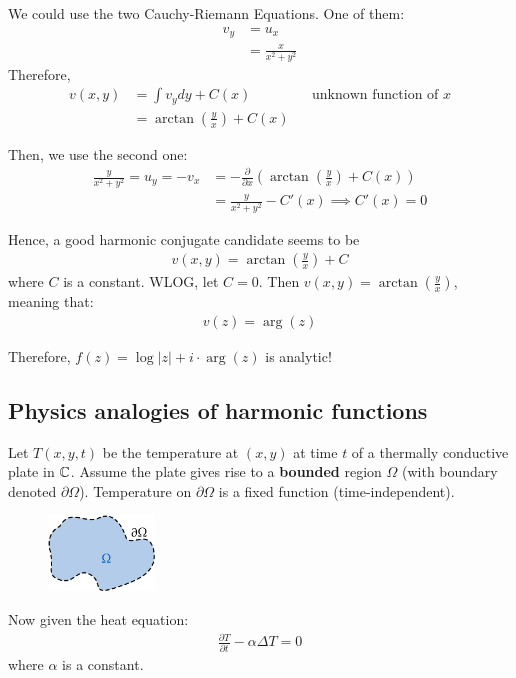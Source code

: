 \documentclass[12pt]{article}
\begin{document}
We could use the two Cauchy-Riemann Equations. One of them:
\begin{align*}
    v_y&=u_x\\
    &= \frac{x}{x^2+y^2}
\end{align*}
Therefore, \begin{align*}
    v(x,y) &= \int v_ydy + C(x) && \text{unknown function of }x\\
    &= \arctan\left(\frac{y}{x}\right)+C(x)
\end{align*}

Then, we use the second one: \begin{align*}
    \frac{y}{x^2+y^2}=u_y=-v_x &= -\frac{\partial}{\partial x} \left( \arctan\left(\frac{y}{x}\right)+C(x)\right)\\
    &= \frac{y}{x^2+y^2}-C'(x) \implies C'(x)=0
\end{align*}

Hence, a good harmonic conjugate candidate seems to be \begin{align*}
    v(x,y) = \arctan\left(\frac{y}{x}\right) + C
\end{align*}
where $C$ is a constant. WLOG, let $C=0$. Then $ v(x,y)=\arctan\left(\frac{y}{x}\right)$, meaning that: \begin{align*}
    v(z)=\arg (z)
\end{align*}

Therefore, $f(z)=\log |z| + i\cdot \arg(z)$ is analytic!

\subsection{Physics analogies of harmonic functions}
\eg Let $T(x,y,t)$ be the temperature at $(x,y)$ at time $t$ of a thermally conductive plate in $\mathbb{C}$. Assume the plate gives rise to a \textbf{bounded} region $\Omega$ (with boundary denoted $\partial \Omega$). Temperature on $\partial \Omega$ is a fixed function (time-independent).

\begin{figure}[H]
    \centering
    \includegraphics[width=80pt]{Images/image-2.png}
\end{figure}

Now given the heat equation: \begin{align*}
    \frac{\partial T}{\partial t}-\alpha \Delta T=0
\end{align*}
where $\alpha$ is a constant.
\end{document}
